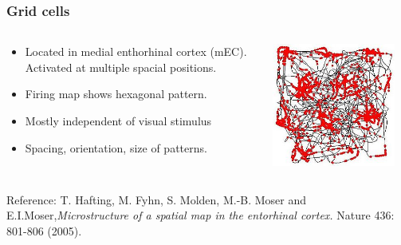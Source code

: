 \documentclass[mathserif]{beamer}
\begin{document}
\begin{frame}
\frametitle{Grid cells}
\begin{columns}[T]
    \begin{column}{.5\textwidth}
			\begin{itemize}
			\item Located in  medial enthorhinal cortex (mEC). Activated at multiple spacial positions. 
			\item Firing map shows hexagonal pattern. 
			\item Mostly independent of visual stimulus
			\item Spacing, orientation, size of  patterns.
			\end{itemize}
    \end{column}
    \begin{column}{.5\textwidth}
    \includegraphics[width= 0.9\textwidth]{RatRunningPath.JPG}
    \end{column}
  \end{columns}
 {\small Reference: \newline
 T. Hafting, M. Fyhn, S. Molden, M.-B. Moser and E.I.Moser,\textit{Microstructure of a spatial map in the entorhinal cortex.} Nature 436: 801-806 (2005).	}
\end{frame}
%
%
\end{document}

